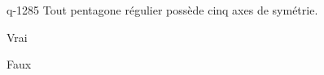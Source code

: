 \begin{truefalse}{q-1285}
Tout pentagone régulier possède cinq axes de symétrie.
\item* Vrai
\item Faux
\end{truefalse}

